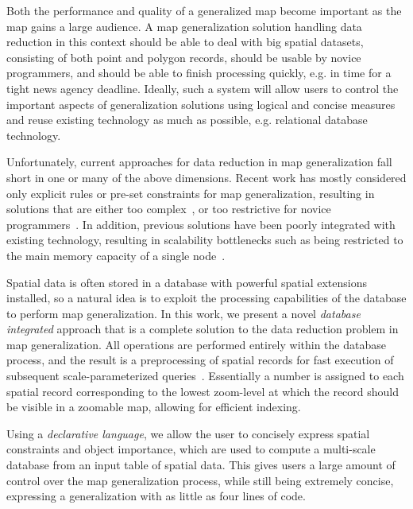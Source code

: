 Both the performance and quality of a generalized map become important as the map gains a large audience. A map generalization solution handling data reduction in this context should be able to deal with big spatial datasets, consisting of both point and polygon records, should be usable by novice programmers, and should be able to finish processing quickly, e.g. in time for a tight news agency deadline. Ideally, such a system will allow users to control the important aspects of generalization solutions using logical and concise measures and reuse existing technology as much as possible, e.g. relational database technology.

Unfortunately, current approaches for data reduction in map generalization fall short in one or many of the above dimensions. Recent work has mostly considered only explicit rules or pre-set constraints for map generalization, resulting in solutions that are either too complex~\cite{sld,mapnik}, or too restrictive for novice programmers~\cite{sarma2012fusiontables,nutanong2012multiresolution}. In addition, previous solutions have been poorly integrated with existing technology, resulting in scalability bottlenecks such as being restricted to the main memory capacity of a single node~\cite{sarma2012fusiontables}. 

Spatial data is often stored in a database with powerful spatial extensions installed, so a natural idea is to exploit the processing capabilities of the database to perform map generalization. In this work, we present a novel \emph{database integrated} approach that is a complete solution to the data reduction problem in map generalization. All operations are performed entirely within the database process, and the result is a preprocessing of spatial records for fast execution of subsequent scale-parameterized queries~\cite{hilbert1891ueber}. Essentially a number is assigned to each spatial record corresponding to the lowest zoom-level at which the record should be visible in a zoomable map, allowing for efficient indexing.

Using a \emph{declarative language}, we allow the user to concisely express spatial constraints and object importance, which are used to compute a multi-scale database from an input table of spatial data. This gives users a large amount of control over the map generalization process, while still being extremely concise, expressing a generalization with as little as four lines of code.

